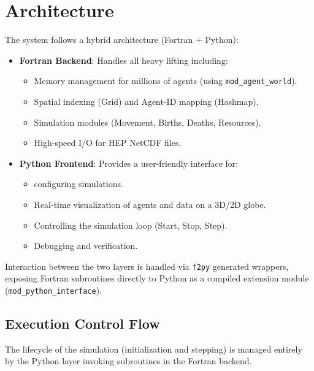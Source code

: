 \section{Architecture}
The system follows a hybrid architecture (Fortran + Python):
\begin{itemize}
    \item \textbf{Fortran Backend}: Handles all heavy lifting including:
    \begin{itemize}
        \item Memory management for millions of agents (using \texttt{mod\_agent\_world}).
        \item Spatial indexing (Grid) and Agent-ID mapping (Hashmap).
        \item Simulation modules (Movement, Births, Deaths, Resources).
        \item High-speed I/O for HEP NetCDF files.
    \end{itemize}
    \item \textbf{Python Frontend}: Provides a user-friendly interface for:
    \begin{itemize}
        \item configuring simulations.
        \item Real-time visualization of agents and data on a 3D/2D globe.
        \item Controlling the simulation loop (Start, Stop, Step).
        \item Debugging and verification.
    \end{itemize}
\end{itemize}

Interaction between the two layers is handled via \texttt{f2py} generated wrappers, exposing Fortran subroutines directly to Python as a compiled extension module (\texttt{mod\_python\_interface}).

\subsection{Execution Control Flow}
The lifecycle of the simulation (initialization and stepping) is managed entirely by the Python layer invoking subroutines in the Fortran backend.

